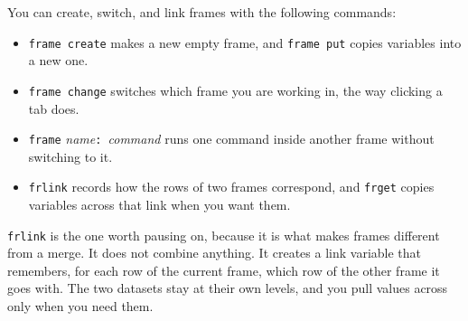 \documentclass[
    a4paper,
    fontsize=10pt,
    twoside=true,
    numbers=noenddot,
]{kaobook}
\begin{document}
You can create, switch, and link frames with the following commands:
\begin{itemize}
    \item \texttt{frame create} makes a new empty frame, and \texttt{frame put} copies variables into a new one.
    \item \texttt{frame change} switches which frame you are working in, the way clicking a tab does.
    \item \texttt{frame} \emph{name}\texttt{: }\emph{command} runs one command inside another frame without switching to it.
    \item \texttt{frlink} records how the rows of two frames correspond, and \texttt{frget} copies variables across that link when you want them.
\end{itemize}
\texttt{frlink} is the one worth pausing on, because it is what makes frames different from a merge. It does not combine anything. It creates a link variable that remembers, for each row of the current frame, which row of the other frame it goes with. The two datasets stay at their own levels, and you pull values across only when you need them.
\end{document}
